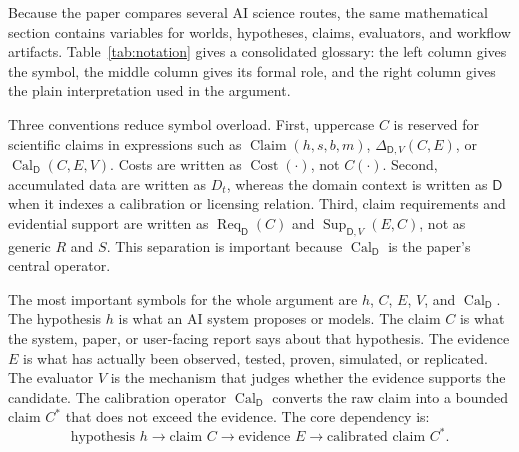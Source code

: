 \documentclass[11pt,a4paper]{article}
\newcommand{\Claim}{\operatorname{Claim}}
\newcommand{\Cal}{\operatorname{Cal}}
\newcommand{\Req}{\operatorname{Req}}
\newcommand{\Sup}{\operatorname{Sup}}
\newcommand{\Cost}{\operatorname{Cost}}
\newcommand{\Dom}{\mathsf{D}}
\begin{document}
Because the paper compares several AI science routes, the same mathematical section contains variables for worlds, hypotheses, claims, evaluators, and workflow artifacts. Table~\ref{tab:notation} gives a consolidated glossary: the left column gives the symbol, the middle column gives its formal role, and the right column gives the plain interpretation used in the argument.

Three conventions reduce symbol overload. First, uppercase $C$ is reserved for scientific claims in expressions such as $\Claim(h,s,b,m)$, $\Delta_{\Dom,V}(C,E)$, or $\Cal_{\Dom}(C,E,V)$. Costs are written as $\Cost(\cdot)$, not $C(\cdot)$. Second, accumulated data are written as $D_t$, whereas the domain context is written as $\Dom$ when it indexes a calibration or licensing relation. Third, claim requirements and evidential support are written as $\Req_{\Dom}(C)$ and $\Sup_{\Dom,V}(E,C)$, not as generic $R$ and $S$. This separation is important because $\Cal_{\Dom}$ is the paper's central operator.

The most important symbols for the whole argument are $h$, $C$, $E$, $V$, and $\Cal_{\Dom}$. The hypothesis $h$ is what an AI system proposes or models. The claim $C$ is what the system, paper, or user-facing report says about that hypothesis. The evidence $E$ is what has actually been observed, tested, proven, simulated, or replicated. The evaluator $V$ is the mechanism that judges whether the evidence supports the candidate. The calibration operator $\Cal_{\Dom}$ converts the raw claim into a bounded claim $C^\ast$ that does not exceed the evidence. The core dependency is:
\[
\boxed{\text{hypothesis }h \longrightarrow \text{claim }C \longrightarrow \text{evidence }E \longrightarrow \text{calibrated claim }C^\ast.}
\]
\end{document}
